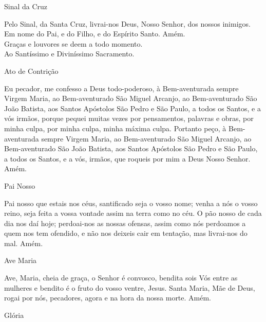 \documentclass{book}
\begin{document}
\begin{center}
    Sinal da Cruz
\end{center}
\begin{flushleft}
    Pelo Sinal, \grecrossRed{} da Santa Cruz, livrai-nos Deus, \grecrossRed{} Nosso Senhor, dos nossos \grecrossRed{} inimigos. Em nome do Pai, \grecrossRed{} e do Filho, e do Espírito Santo. Amém.
    \vspace{.2cm} \\
    \VbarRed{} Graças e louvores se deem a todo momento. \\
    \RbarRed{} Ao Santíssimo e Diviníssimo Sacramento.
\end{flushleft}
\begin{center}
    Ato de Contrição
\end{center}
\begin{flushleft}
    Eu pecador, me confesso a Deus todo-poderoso, à Bem-aventurada sempre Virgem Maria, ao Bem-aventurado São Miguel Arcanjo, ao Bem-aventurado São João Batista, aos Santos Apóstolos São Pedro e São Paulo, a todos os Santos, e a vós irmãos, porque pequei muitas vezes por pensamentos, palavras e obras, por minha culpa, por minha culpa, minha máxima culpa. Portanto peço, à Bem-aventurada sempre Virgem Maria, ao Bem-aventurado São Miguel Arcanjo, ao Bem-aventurado São João Batista, aos Santos Apóstolos São Pedro e São Paulo, a todos os Santos, e a vós, irmãos, que roqueis por mim a Deus Nosso Senhor. Amém.
\end{flushleft}
\begin{center}
    Pai Nosso
\end{center}
\begin{flushleft}
    Pai nosso que estais nos céus, santificado seja o vosso nome; venha a nós o vosso reino, seja feita a vossa vontade assim na terra como no céu. O pão nosso de cada dia nos daí hoje; perdoai-nos as nossas ofensas, assim como nós perdoamos a quem nos tem ofendido, e não nos deixeis cair em tentação, mas livrai-nos do mal. Amém.
\end{flushleft}
\begin{center}
    Ave Maria
\end{center}
\begin{flushleft}
    Ave, Maria, cheia de graça, o Senhor é convosco, bendita sois Vós entre as mulheres e bendito é o fruto do vosso ventre, Jesus. Santa Maria, Mãe de Deus, rogai por nós, pecadores, agora e na hora da nossa morte. Amém.
\end{flushleft}
\begin{center}
    Glória
\end{center}
\end{document}
